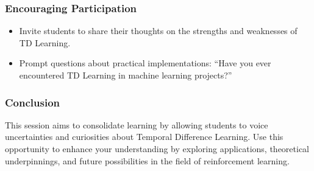 \documentclass[aspectratio=169]{beamer}
\begin{document}
\begin{frame}[fragile]
    \frametitle{Encouraging Participation}
    \begin{itemize}
        \item Invite students to share their thoughts on the strengths and weaknesses of TD Learning.
        \item Prompt questions about practical implementations: “Have you ever encountered TD Learning in machine learning projects?”
    \end{itemize}
\end{frame}

\begin{frame}[fragile]
    \frametitle{Conclusion}
    This session aims to consolidate learning by allowing students to voice uncertainties and curiosities about Temporal Difference Learning. Use this opportunity to enhance your understanding by exploring applications, theoretical underpinnings, and future possibilities in the field of reinforcement learning.
\end{frame}
\end{document}
